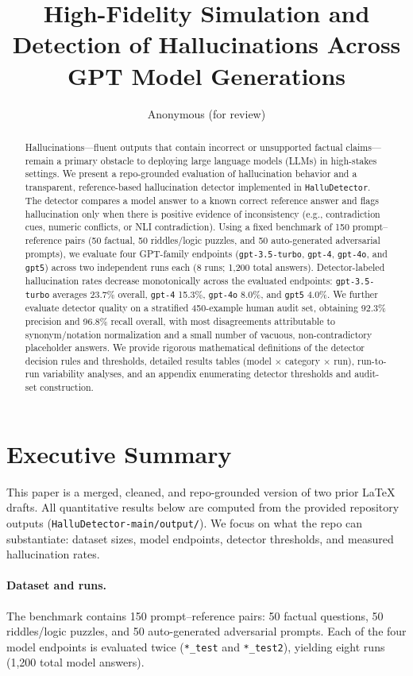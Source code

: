 \documentclass[11pt]{article}
\title{High-Fidelity Simulation and Detection of Hallucinations Across GPT Model Generations}
\author{Anonymous (for review)}
\date{}
\newcommand{\model}[1]{\texttt{#1}}
\newcommand{\dataset}{\texttt{HalluDetector}}
\begin{document}
\maketitle

\begin{abstract}
Hallucinations---fluent outputs that contain incorrect or unsupported factual claims---remain a primary obstacle to deploying large language models (LLMs) in high-stakes settings. We present a repo-grounded evaluation of hallucination behavior and a transparent, reference-based hallucination detector implemented in \dataset. The detector compares a model answer to a known correct reference answer and flags hallucination only when there is positive evidence of inconsistency (e.g., contradiction cues, numeric conflicts, or NLI contradiction). Using a fixed benchmark of 150 prompt--reference pairs (50 factual, 50 riddles/logic puzzles, and 50 auto-generated adversarial prompts), we evaluate four GPT-family endpoints (\model{gpt-3.5-turbo}, \model{gpt-4}, \model{gpt-4o}, and \model{gpt5}) across two independent runs each (8 runs; 1,200 total answers). Detector-labeled hallucination rates decrease monotonically across the evaluated endpoints: \model{gpt-3.5-turbo} averages 23.7\% overall, \model{gpt-4} 15.3\%, \model{gpt-4o} 8.0\%, and \model{gpt5} 4.0\%. We further evaluate detector quality on a stratified 450-example human audit set, obtaining 92.3\% precision and 96.8\% recall overall, with most disagreements attributable to synonym/notation normalization and a small number of vacuous, non-contradictory placeholder answers. We provide rigorous mathematical definitions of the detector decision rules and thresholds, detailed results tables (model \(\times\) category \(\times\) run), run-to-run variability analyses, and an appendix enumerating detector thresholds and audit-set construction.
\end{abstract}

\section{Executive Summary}
This paper is a merged, cleaned, and repo-grounded version of two prior LaTeX drafts. All quantitative results below are computed from the provided repository outputs (\texttt{HalluDetector-main/output/}). We focus on what the repo can substantiate: dataset sizes, model endpoints, detector thresholds, and measured hallucination rates.

\paragraph{Dataset and runs.}
The benchmark contains 150 prompt--reference pairs: 50 factual questions, 50 riddles/logic puzzles, and 50 auto-generated adversarial prompts. Each of the four model endpoints is evaluated twice (\texttt{*\_test} and \texttt{*\_test2}), yielding eight runs (1,200 total model answers).
\end{document}
